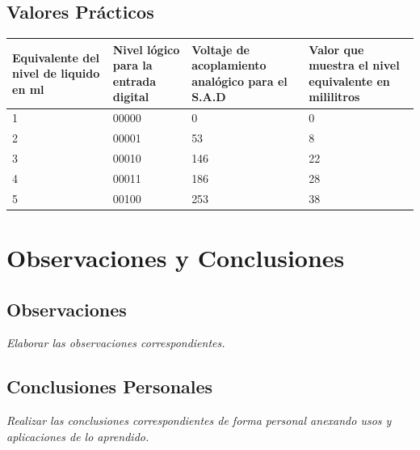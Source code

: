 \documentclass[11pt]{scrartcl}
\newcommand{\indicacion}[1]{\noindent\textit{\small #1}}
\begin{document}
\subsection{Valores Prácticos}
\begin{center}
\begin{tabular}{|p{4cm}|p{4cm}|p{4cm}|p{4cm}|}
\hline
\textbf{Equivalente del nivel de liquido en ml}& \textbf{Nivel lógico para la entrada digital} & \textbf{Voltaje de acoplamiento analógico para el S.A.D} & \textbf{Valor que muestra el nivel equivalente en mililitros}\\
\hline
1 & 00000 & 0 & 0 \\[4px]
\hline
2 & 00001 &53 &8 \\ [4px]
\hline
3 & 00010 & 146 & 22 \\[4px] 
\hline
4 & 00011 &186 & 28\\ [4px]
\hline
5 &00100 & 253 & 38 \\[4px]
\hline
\end{tabular}   
\end{center}

\section{Observaciones y Conclusiones}

\subsection{Observaciones}
\indicacion{
    Elaborar las observaciones correspondientes.
}

\subsection{Conclusiones Personales}
\indicacion{
    Realizar las conclusiones correspondientes de forma personal anexando usos y aplicaciones de lo aprendido.
}


  

    
\end{document}
